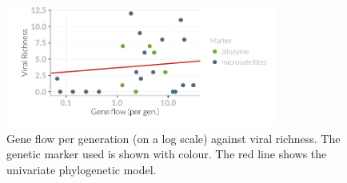 




















































\begin{knitrout}\footnotesize
{}\color{fgcolor}\begin{figure}[t]

{\centering \includegraphics[width=0.8\textwidth]{figure/fstRawData-1} 

}

\caption[Gene flow per generation (on a log scale) against viral richness]{Gene flow per generation (on a log scale) against viral richness. The genetic marker used is shown with colour. The red line shows the univariate phylogenetic model.}\label{fig:fstRawData}
\end{figure}


\end{knitrout}



